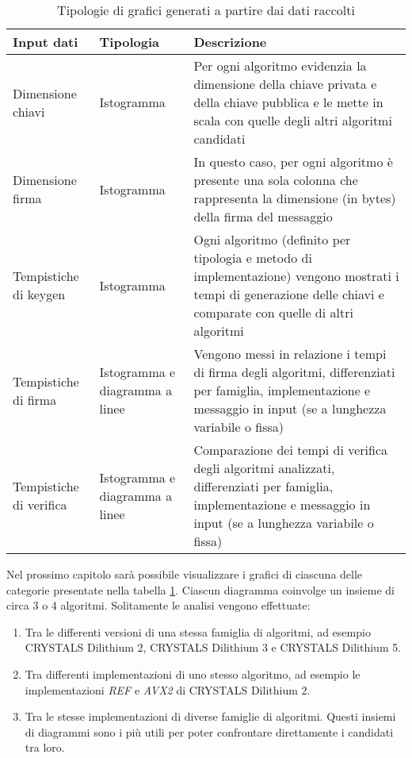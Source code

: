 \begin{table}[H]
\centering
\begin{tabular}{|p{2.3cm}|p{2.3cm}|p{10cm}|}
\hline
\textbf{Input dati} & \textbf{Tipologia} & \textbf{Descrizione} \\
\hline
Dimensione chiavi & Istogramma & Per ogni algoritmo evidenzia la dimensione della chiave privata e della chiave pubblica e le mette in scala con quelle degli altri algoritmi candidati \\
\hline
Dimensione firma & Istogramma & In questo caso, per ogni algoritmo è presente una sola colonna che rappresenta la dimensione (in bytes) della firma del messaggio \\
\hline
Tempistiche di keygen & Istogramma & Ogni algoritmo (definito per tipologia e metodo di implementazione) vengono mostrati i tempi di generazione delle chiavi e comparate con quelle di altri algoritmi \\
\hline
Tempistiche di firma & Istogramma e diagramma a linee & Vengono messi in relazione i tempi di firma degli algoritmi, differenziati per famiglia, implementazione e messaggio in input (se a lunghezza variabile o fissa) \\
\hline
Tempistiche di verifica & Istogramma e diagramma a linee & Comparazione dei tempi di verifica degli algoritmi analizzati, differenziati per famiglia, implementazione e messaggio in input (se a lunghezza variabile o fissa) \\
\hline
\end{tabular}
\caption{Tipologie di grafici generati a partire dai dati raccolti}
\label{tab:grafici}
\end{table}

Nel prossimo capitolo sarà possibile visualizzare i grafici di ciascuna delle categorie presentate nella tabella \ref{tab:grafici}. Ciascun diagramma coinvolge un insieme di circa 3 o 4 algoritmi. Solitamente le analisi vengono effettuate:
\begin{enumerate}
    \item Tra le differenti versioni di una stessa famiglia di algoritmi, ad esempio CRYSTALS Dilithium 2, CRYSTALS Dilithium 3 e CRYSTALS Dilithium 5.
    \item Tra differenti implementazioni di uno stesso algoritmo, ad esempio le implementazioni \textit{REF} e \textit{AVX2} di CRYSTALS Dilithium 2.
    \item Tra le stesse implementazioni di diverse famiglie di algoritmi. Questi insiemi di diagrammi sono i più utili per poter confrontare direttamente i candidati tra loro.
\end{enumerate}

